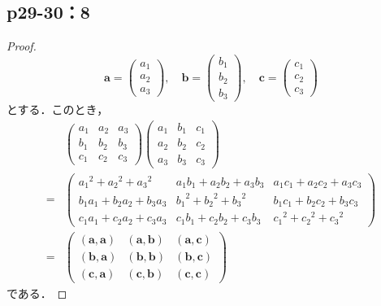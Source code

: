 \documentclass[uplatex,dvipdfmx,a4paper,10pt,fleqn]{jsarticle}
\begin{document}
\subsection*{p29-30：8}
\begin{tleftbar}
    \begin{proof}
    \[
    \bm{a}=\begin{pmatrix} a_1 \\ a_2 \\ a_3 \end{pmatrix},\quad \bm{b}=\begin{pmatrix} b_1 \\ b_2 \\ b_3 \end{pmatrix},\quad \bm{c}=\begin{pmatrix} c_1 \\ c_2 \\ c_3 \end{pmatrix}
    \]
    とする．このとき，
    \begin{align*}
        &
        \begin{pmatrix}
            a_1 & a_2 & a_3 \\
            b_1 & b_2 & b_3 \\
            c_1 & c_2 & c_3
        \end{pmatrix}
        \begin{pmatrix}
            a_1 & b_1 & c_1 \\
            a_2 & b_2 & c_2 \\
            a_3 & b_3 & c_3
        \end{pmatrix}
        \\
         =& \begin{pmatrix}
            {a_1}^2 +{a_2}^2 +{a_3}^2 & a_1 b_1 + a_2 b_2 + a_3 b_3 & a_1 c_1 + a_2 c_2 + a_3 c_3 \\
            b_1 a_1 + b_2 a_2 + b_3 a_3 & {b_1}^2 +{b_2}^2 + {b_3}^2 & b_1 c_1 + b_2 c_2 + b_3 c_3 \\
            c_1 a_1 + c_2 a_2 + c_3 a_3 & c_1 b_1 + c_2 b_2 + c_3 b_3 & {c_1}^2 +{c_2}^2 +{c_3}^2
        \end{pmatrix}
        \\
        =& \begin{pmatrix}
            (\bm{a},\bm{a}) & (\bm{a},\bm{b}) & (\bm{a},\bm{c}) \\
            (\bm{b},\bm{a}) & (\bm{b},\bm{b}) & (\bm{b},\bm{c}) \\
            (\bm{c},\bm{a}) & (\bm{c},\bm{b}) & (\bm{c},\bm{c})
        \end{pmatrix}
    \end{align*}
    である．


\end{proof}
\end{tleftbar}
\end{document}

